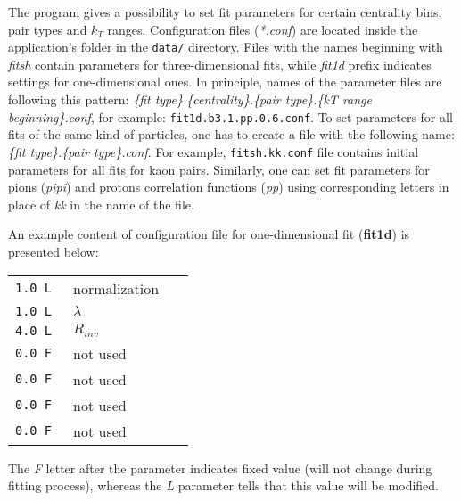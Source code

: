       The program gives a possibility to set fit parameters for certain centrality bins, pair types and $k_T$ ranges.
      Configuration files (\textit{*.conf}) are located inside the application's folder in the \verb|data/| directory.
      Files with the names beginning with \textit{fitsh} contain parameters for three-dimensional fits, while \textit{fit1d} prefix indicates settings for one-dimensional ones.
      In principle, names of the parameter files are following this pattern: \textit{\{fit type\}.\{centrality\}.\{pair type\}.\{kT range beginning\}.conf}, for example: \verb|fit1d.b3.1.pp.0.6.conf|.
      To set parameters for all fits of the same kind of particles, one has to create a file with the following name: \textit{\{fit type\}.\{pair type\}.conf}. For example, \verb|fitsh.kk.conf| file contains initial parameters for all fits for kaon pairs.
      Similarly, one can set fit parameters for pions (\textit{pipi}) and protons correlation functions (\textit{pp}) using corresponding letters in place of \textit{kk} in the name of the file.


      An example content of configuration file for one-dimensional fit (\textbf{fit1d}) is presented below:
      \begin{longtable}{p{0.2\linewidth}p{0.2\linewidth}}
        \verb|1.0 L|   & normalization\\
        \verb|1.0 L|   & $\lambda$\\
        \verb|4.0 L|   & $R_{inv}$\\
        \verb|0.0 F|   & not used \\
        \verb|0.0 F|   & not used \\
        \verb|0.0 F|   & not used \\
        \verb|0.0 F|   & not used \\
      \end{longtable}
      The \textit{F} letter after the parameter indicates fixed value (will not change during fitting process), whereas the \textit{L} parameter tells that this value will be modified.

